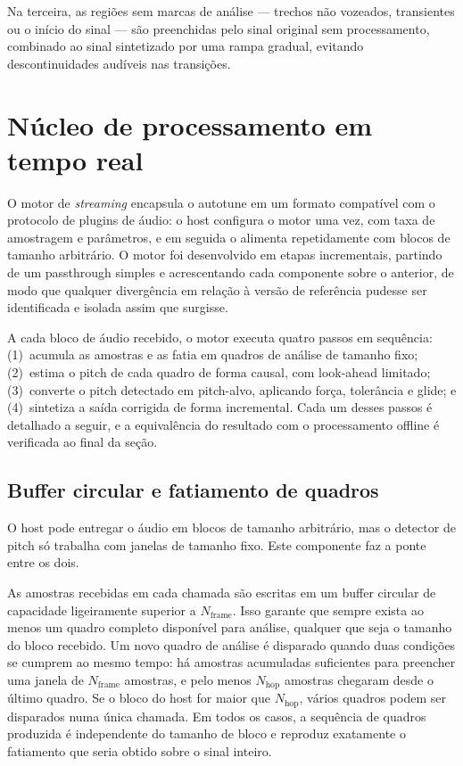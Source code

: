 Na terceira, as regiões sem marcas de análise --- trechos não vozeados, transientes ou o início do sinal --- são preenchidas pelo sinal original sem processamento, combinado ao sinal sintetizado por uma rampa gradual, evitando descontinuidades audíveis nas transições.

\section{Núcleo de processamento em tempo real}
\label{sec:impl_streaming}

O motor de \textit{streaming} encapsula o autotune em um formato compatível com o protocolo de plugins de áudio: o host configura o motor uma vez, com taxa de amostragem e parâmetros, e em seguida o alimenta repetidamente com blocos de tamanho arbitrário. O motor foi desenvolvido em etapas incrementais, partindo de um passthrough simples e acrescentando cada componente sobre o anterior, de modo que qualquer divergência em relação à versão de referência pudesse ser identificada e isolada assim que surgisse.

A cada bloco de áudio recebido, o motor executa quatro passos em sequência: (1)~acumula as amostras e as fatia em quadros de análise de tamanho fixo; (2)~estima o pitch de cada quadro de forma causal, com look-ahead limitado; (3)~converte o pitch detectado em pitch-alvo, aplicando força, tolerância e glide; e (4)~sintetiza a saída corrigida de forma incremental. Cada um desses passos é detalhado a seguir, e a equivalência do resultado com o processamento offline é verificada ao final da seção.

\subsection{Buffer circular e fatiamento de quadros}

O host pode entregar o áudio em blocos de tamanho arbitrário, mas o detector de pitch só trabalha com janelas de tamanho fixo. Este componente faz a ponte entre os dois.

As amostras recebidas em cada chamada são escritas em um buffer circular de capacidade ligeiramente superior a $N_{\text{frame}}$. Isso garante que sempre exista ao menos um quadro completo disponível para análise, qualquer que seja o tamanho do bloco recebido. Um novo quadro de análise é disparado quando duas condições se cumprem ao mesmo tempo: há amostras acumuladas suficientes para preencher uma janela de $N_{\text{frame}}$ amostras, e pelo menos $N_{\text{hop}}$ amostras chegaram desde o último quadro. Se o bloco do host for maior que $N_{\text{hop}}$, vários quadros podem ser disparados numa única chamada. Em todos os casos, a sequência de quadros produzida é independente do tamanho de bloco e reproduz exatamente o fatiamento que seria obtido sobre o sinal inteiro.

